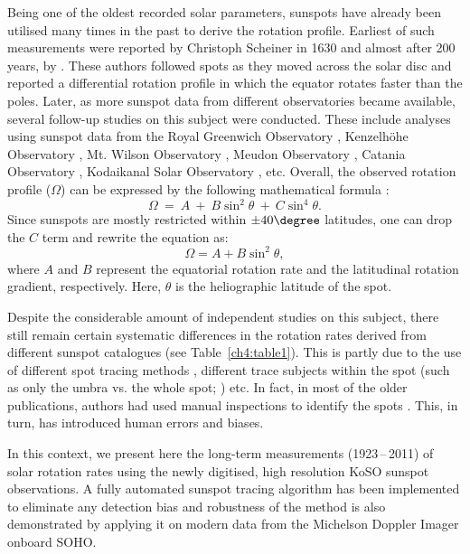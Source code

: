 Being one of the oldest recorded solar parameters, sunspots have already been utilised many times in the past to derive the rotation profile. Earliest of such measurements were reported by Christoph Scheiner in 1630 and almost after 200 years, by \citet{Carrington1863}. These authors followed spots as they moved across the solar disc and reported a differential rotation profile in which the equator rotates faster than the poles. Later, as more sunspot data from different observatories became available, several follow-up studies on this subject were conducted. These include analyses using sunspot data from the Royal Greenwich Observatory \citep[][etc]{Newton1951, Ward1966, Balthasar1986, Javaraiah2005a}, Kenzelh\"ohe Observatory \citep{Lustig1983}, Mt. Wilson Observatory \citep[][etc.]{Howard1984, Gilman1984, Gilman1985}, Meudon Observatory \citep{Ribes1993}, Catania Observatory \citep{Ternullo1981}, Kodaikanal Solar Observatory \citep[KoSO:][]{Howard1999, Gupta1999}, etc. Overall, the observed rotation profile ($\Omega$) can be expressed by the following mathematical formula \citep{Newton1951, Howard1984}:
%
\begin{equation}
    \Omega~=~A~+~B\sin^2 {\theta}~+~C\sin^4{\theta}.
    \label{eq1}
\end{equation}
%
Since sunspots are mostly restricted within $\pm40 \degree$ latitudes, one can drop the $C$ term \citep{Newton1951, Howard1984, Woehl2010} and rewrite the equation as:
\begin{equation}
    \Omega=A+B\sin^2{\theta},
    \label{ch4:eq2}
\end{equation}
%
where $A$ and $B$ represent the equatorial rotation rate and the latitudinal rotation gradient, respectively. Here, $\theta$ is the heliographic latitude of the spot.


Despite the considerable amount of independent studies on this subject, there still remain certain systematic differences in the rotation rates derived from different sunspot catalogues (see Table~\ref{ch4:table1}). This is partly due to the use of different spot tracing methods \citep{Newton1951, Howard1984, PoljancicBeljan2017}, different trace subjects within the spot (such as only the umbra vs. the whole spot; \citealp{Howard1999, Gupta1999}) etc. In fact, in most of the older publications, authors had used manual inspections to identify the spots \citep{Newton1951, Gupta1999}. This, in turn, has introduced human errors and biases.


In this context, we present here the long-term measurements (1923\,--\,2011) of solar rotation rates using the newly digitised, high resolution KoSO sunspot observations. A fully automated sunspot tracing algorithm has been implemented to eliminate any detection bias and robustness of the method is also demonstrated by applying it on modern data from the Michelson Doppler Imager \citep[MDI:][]{Scherrer1995} onboard SOHO.

